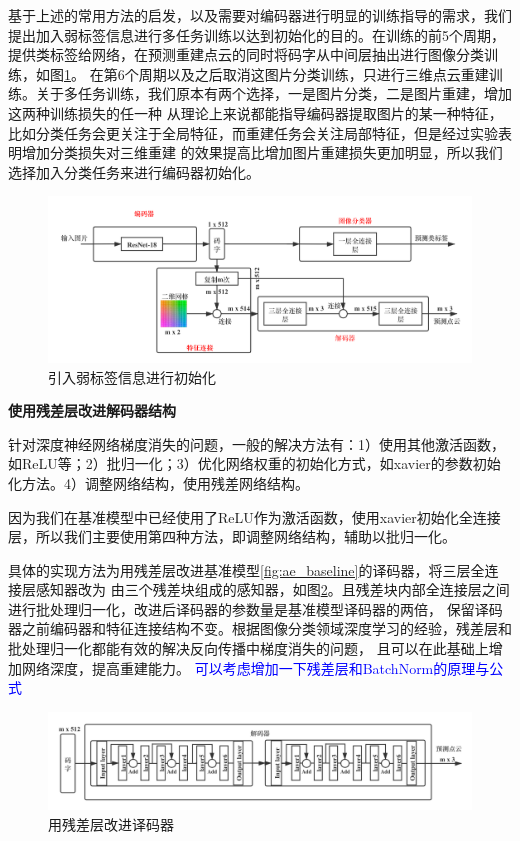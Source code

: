 \documentclass[bachelor, nocolorlinks, printoneside]{seuthesis} %
\newcommand\TODO[1]{\textcolor{blue}{#1}}
\begin{document}
\begin{Main}
基于上述的常用方法的启发，以及需要对编码器进行明显的训练指导的需求，我们提出加入弱标签信息进行多任务训练以达到初始化的目的。在训练的前5个周期，提供类标签给网络，在预测重建点云的同时将码字从中间层抽出进行图像分类训练，如图\ref{fig:class_init}。
在第6个周期以及之后取消这图片分类训练，只进行三维点云重建训练。关于多任务训练，我们原本有两个选择，一是图片分类，二是图片重建，增加这两种训练损失的任一种
从理论上来说都能指导编码器提取图片的某一种特征，比如分类任务会更关注于全局特征，而重建任务会关注局部特征，但是经过实验表明增加分类损失对三维重建
的效果提高比增加图片重建损失更加明显，所以我们选择加入分类任务来进行编码器初始化。

\begin{figure}
    \centering
    \includegraphics[width=0.99\columnwidth]{figs/model/ae_baseline_class.png}
    \caption{引入弱标签信息进行初始化}
    \label{fig:class_init}
\end{figure}
\FloatBarrier

\noindent
\textbf{使用残差层改进解码器结构}
\label{sec:resnet_decoder}

针对深度神经网络梯度消失的问题，一般的解决方法有：1）使用其他激活函数，如ReLU等；2）批归一化；3）优化网络权重的初始化方式，如xavier的参数初始化方法。4）调整网络结构，使用残差网络结构。

因为我们在基准模型中已经使用了ReLU作为激活函数，使用xavier初始化全连接层，所以我们主要使用第四种方法，即调整网络结构，辅助以批归一化。

具体的实现方法为用残差层改进基准模型\ref{fig:ae_baseline}的译码器，将三层全连接层感知器改为
由三个残差块组成的感知器，如图\ref{fig:resnet_decoder}。且残差块内部全连接层之间进行批处理归一化，改进后译码器的参数量是基准模型译码器的两倍，
保留译码器之前编码器和特征连接结构不变。根据图像分类领域深度学习的经验，残差层和批处理归一化都能有效的解决反向传播中梯度消失的问题，
且可以在此基础上增加网络深度，提高重建能力。
\TODO{可以考虑增加一下残差层和BatchNorm的原理与公式}
\begin{figure}
    \centering
    \includegraphics[width=0.99\columnwidth]{figs/model/resnet_decoder.png}
    \caption{用残差层改进译码器}
    \label{fig:resnet_decoder}
\end{figure}


\end{Main}
\end{document}
